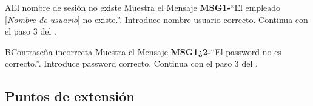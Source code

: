 		\begin{UCtrayectoriaA}{A}{El nombre de sesión no existe}
			\UCpaso[\UCactor] Muestra el Mensaje {\bf MSG1-}``El empleado [{\em Nombre de usuario}] no existe.''.
			\UCpaso[\UCactor] Introduce nombre usuario correcto.
			\UCpaso[] Continua con el paso 3 del .
		\end{UCtrayectoriaA}
		
		\begin{UCtrayectoriaA}{B}{Contraseña incorrecta}
			\UCpaso Muestra el Mensaje {\bf MSG1¿2-}``El password no es correcto.''.
			\UCpaso[\UCactor] Introduce password correcto.
			\UCpaso[] Continua con el paso 3 del .
		\end{UCtrayectoriaA}


\subsection{Puntos de extensión}
		
		

